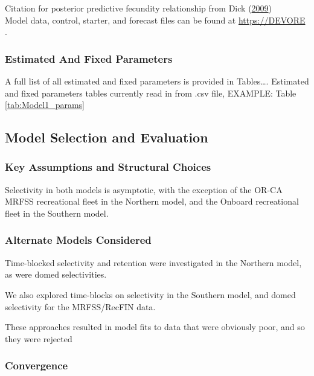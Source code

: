 \documentclass[12pt,]{article}
\begin{document}
Citation for posterior predictive fecundity relationship from Dick
(\protect\hyperlink{ref-Dick2009}{2009})\\
Model data, control, starter, and forecast files can be found at
\url{https://DEVORE} .

\subsubsection{Estimated And Fixed
Parameters}\label{estimated-and-fixed-parameters}

A full list of all estimated and fixed parameters is provided in
Tables\ldots{}. Estimated and fixed parameters tables currently read in
from .csv file, EXAMPLE: Table \ref{tab:Model1_params}

\clearpage

\subsection{Model Selection and
Evaluation}\label{model-selection-and-evaluation}

\subsubsection{Key Assumptions and Structural
Choices}\label{key-assumptions-and-structural-choices}

Selectivity in both models is asymptotic, with the exception of the
OR-CA MRFSS recreational fleet in the Northern model, and the Onboard
recreational fleet in the Southern model.

\subsubsection{Alternate Models
Considered}\label{alternate-models-considered}

Time-blocked selectivity and retention were investigated in the Northern
model, as were domed selectivities.

We also explored time-blocks on selectivity in the Southern model, and
domed selectivity for the MRFSS/RecFIN data.

These approaches resulted in model fits to data that were obviously
poor, and so they were rejected

\subsubsection{Convergence}\label{convergence}
\end{document}
